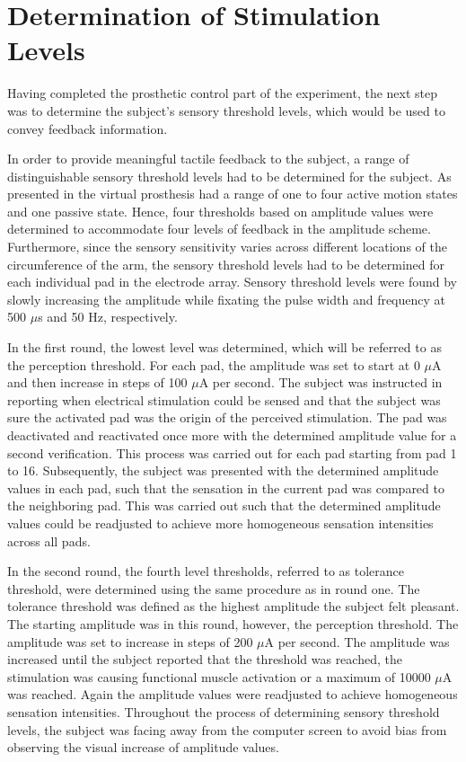 
\section{Determination of Stimulation Levels}

Having completed the prosthetic control part of the experiment, the next step was to determine the subject's sensory threshold levels, which would be used to convey feedback information.

In order to provide meaningful tactile feedback to the subject, a range of distinguishable sensory threshold levels had to be determined for the subject. As presented in  the virtual prosthesis had a range of one to four active motion states and one passive state. Hence, four thresholds based on amplitude values were determined to accommodate four levels of feedback in the amplitude scheme. Furthermore, since the sensory sensitivity varies across different locations of the circumference of the arm, the sensory threshold levels had to be determined for each individual pad in the electrode array. Sensory threshold levels were found by slowly increasing the amplitude while fixating the pulse width and frequency at 500 $\mu$s and 50 Hz, respectively. 

In the first round, the lowest level was determined, which will be referred to as the perception threshold. For each pad, the amplitude was set to start at 0 $\mu $A and then increase in steps of 100 $\mu$A per second. The subject was instructed in reporting when electrical stimulation could be sensed and that the subject was sure the activated pad was the origin of the perceived stimulation. The pad was deactivated and reactivated once more with the determined amplitude value for a second verification. This process was carried out for each pad starting from pad 1 to 16. Subsequently, the subject was presented with the determined amplitude values in each pad, such that the sensation in the current pad was compared to the neighboring pad. This was carried out such that the determined amplitude values could be readjusted to achieve more homogeneous sensation intensities across all pads.  

In the second round, the fourth level thresholds, referred to as tolerance threshold, were determined using the same procedure as in round one. The tolerance threshold was defined as the highest amplitude the subject felt pleasant. The starting amplitude was in this round, however, the perception threshold. The amplitude was set to increase in steps of 200 $\mu$A per second. The amplitude was increased until the subject reported that the threshold was reached, the stimulation was causing functional muscle activation or a maximum of 10000 $\mu$A was reached. Again the amplitude values were readjusted to achieve homogeneous sensation intensities. Throughout the process of determining sensory threshold levels, the subject was facing away from the computer screen to avoid bias from observing the visual increase of amplitude values.  

